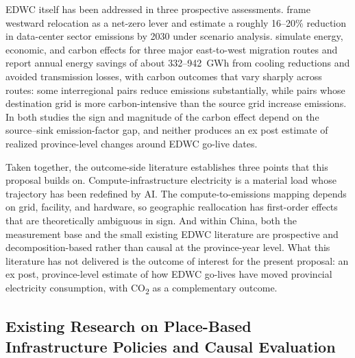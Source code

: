 \documentclass[12pt,a4paper]{article}
\begin{document}
EDWC itself has been addressed in three prospective assessments.
\citet{zhangetal-2025-easterndatawestern} frame westward relocation
as a net-zero lever and estimate a roughly 16--20\% reduction in
data-center sector emissions by 2030 under scenario analysis.
\citet{zhangetal-2025-decarbonizingdatacenters} simulate energy,
economic, and carbon effects for three major east-to-west migration
routes and report annual energy savings of about 332--942~GWh from
cooling reductions and avoided transmission losses, with carbon
outcomes that vary sharply across routes: some interregional pairs
reduce emissions substantially, while pairs whose destination grid
is more carbon-intensive than the source grid increase emissions. In
both studies the sign and magnitude of the carbon effect depend on
the source--sink emission-factor gap, and neither produces an ex post
estimate of realized province-level changes around EDWC go-live
dates.

Taken together, the outcome-side literature establishes three points
that this proposal builds on. Compute-infrastructure electricity is a
material load whose trajectory has been redefined by AI. The
compute-to-emissions mapping depends on grid, facility, and
hardware, so geographic reallocation has first-order effects that are
theoretically ambiguous in sign. And within China, both the
measurement base and the small existing EDWC literature are
prospective and decomposition-based rather than causal at the
province-year level. What this literature has not delivered is the
outcome of interest for the present proposal: an ex post, province-level
estimate of how EDWC go-lives have moved provincial electricity
consumption, with CO\textsubscript{2} as a complementary outcome.


\subsection{Existing Research on Place-Based Infrastructure Policies
and Causal Evaluation}
%
%
%
%
\end{document}
